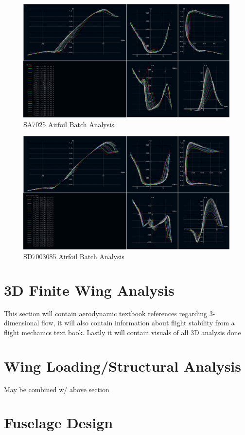 \documentclass[]{article}
\begin{document}
\begin{figure}[H]
\includegraphics[scale=0.4]{sa7025_batch}
\caption{SA7025 Airfoil Batch Analysis}
\end{figure}

\begin{figure}[H]
\includegraphics[scale=0.4]{sd7003085_batch}
\caption{SD7003085 Airfoil Batch Analysis}
\end{figure}

\section{3D Finite Wing Analysis}
This section will contain aerodynamic textbook references regarding 3-dimensional flow, it will also contain information about flight stability from a flight mechanics text book. Lastly it will contain visuals of all 3D analysis done 

\section{Wing Loading/Structural Analysis}
May be combined w/ above section
\section{Fuselage Design}
\end{document}
